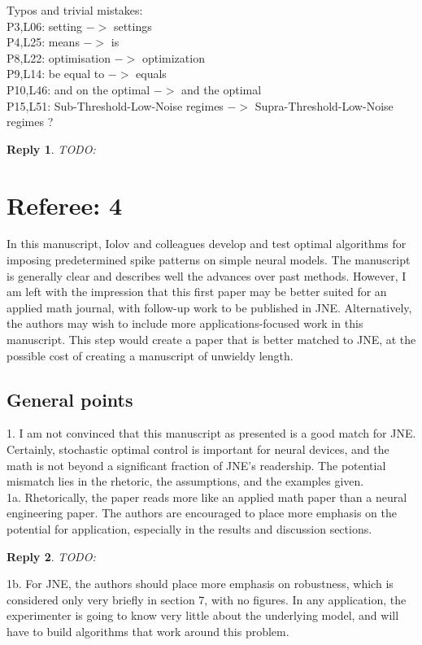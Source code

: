 \documentclass{article}
\newtheorem*{rep}{Reply}
\begin{document}
Typos and trivial mistakes: \\
P3,L06: setting $->$ settings\\
P4,L25: means $->$ is\\
P8,L22: optimisation $->$ optimization\\
P9,L14: be equal to $->$ equals\\
P10,L46: and on the optimal $->$ and the optimal\\
P15,L51: Sub-Threshold-Low-Noise regimes $- >$ Supra-Threshold-Low-Noise regimes
?
\begin{rep}
TODO:
\end{rep}

\clearpage
\section{Referee: 4}
In this manuscript, Iolov and colleagues develop and
test optimal algorithms for imposing predetermined spike patterns on simple
neural models.  The manuscript is generally clear and describes well the
advances over past methods.  However, I am left with the impression that this
first paper may be better suited for an applied math journal, with follow-up
work to be published in JNE.  Alternatively, the authors may wish to include
more applications-focused work in this manuscript.  This step would create a
paper that is better matched to JNE, at the possible cost of creating a
manuscript of unwieldy length.


\subsection{General points}
1. I am not convinced that this manuscript as presented is
a good match for JNE.  Certainly, stochastic optimal control is important for
neural devices, and the math is not beyond a significant fraction of JNE’s
readership.  The potential mismatch lies in the rhetoric, the assumptions, and
the examples given. 
\\1a. Rhetorically, the paper reads more like an applied
math paper than a neural engineering paper.  The authors are encouraged to place more
emphasis on the potential for application, especially in the results and
discussion sections. 
\begin{rep} TODO: \end{rep}

1b. For JNE, the authors should place more emphasis on robustness, which is
considered only very briefly in section 7, with no figures. In any application,
the experimenter is going to know very little about the underlying model, and
will have to build algorithms that work around this problem.
\end{document}
